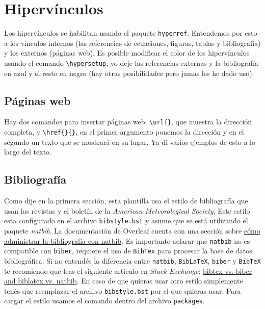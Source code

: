 \documentclass[a4paper,10pt,twocolumn,twoside]{article}
\begin{document}
\section{Hipervínculos}

Los hipervínculos se habilitan usando el paquete \texttt{hyperref}. Entendemos por esto a los vínculos internos (las referencias de ecuaciones, figuras, tablas y bibliografía) y los externos (páginas web). Es posible modificar el color de los hipervínculos usando el comando \verb+\hypersetup+, yo deje las referencias externas y la bibliografía en azul y el resto en negro (hay otras posibilidades pero jamas les he dado uso).

\subsection{Páginas web}
Hay dos comandos para insertar páginas web: \verb+\url{}+, que muestra la dirección completa, y \verb+\href{}{}+, en el primer argumento ponemos la dirección y en el segundo un texto que se mostrará en su lugar. Ya di varios ejemplos de esto a lo largo del texto.

\subsection{Bibliografía}

Como dije en la primera sección, esta plantilla usa el estilo de bibliografía que usan las revistas y el boletín de la \emph{American Meteorological Society}. Este estilo esta configurado en el archivo \texttt{bibstyle.bst} y asume que se está utilizando el paquete \emph{natbib}. La documentación de Overleaf cuenta con una sección sobre \href{https://www.overleaf.com/learn/latex/bibliography_management_with_natbib}{cómo administrar la bibliografía con natbib}. Es importante aclarar que \texttt{natbib} no es compatible con \texttt{biber}, requiere el uso de \texttt{BibTex} para procesar la base de datos bibliográfica. Si no entendés la diferencia entre \texttt{natbib}, \texttt{BibLaTeX}, \texttt{biber} y \texttt{BibTeX} te recomiendo que leas el siguiente artículo en \emph{Stack Exchange}: \href{https://tex.stackexchange.com/questions/25701/bibtex-vs-biber-and-biblatex-vs-natbib}{bibtex vs. biber and biblatex vs. natbib}. En caso de que quieras usar otro estilo simplemente tenés que reemplazar el archivo \texttt{bibstyle.bst} por el que quieras usar. Para cargar el estilo usamos el comando \verb++ dentro del archivo \texttt{packages}.
\end{document}
